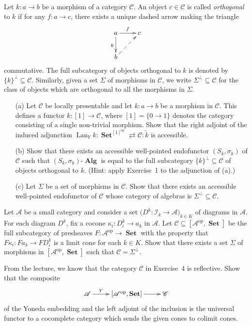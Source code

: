 \documentclass[12pt, a4paper]{article}
\DeclareMathOperator{\op}{op}
\DeclareMathOperator{\Lan}{Lan}
\DeclareMathOperator{\Alg}{\mathbf{Alg}}
\DeclareMathOperator{\Set}{\mathbf{Set}}
\newcommand{\ca}[1]{\mathscr{#1}}
\theoremstyle{plain}
\theoremstyle{definition}
\theoremstyle{citing}
\theoremstyle{citingdfn}
\numberwithin{equation}{section}
\begin{document}
\begin{question}
 Let $k \colon a \rightarrow b$ be a morphism of a category $\ca{C}$. An object $c \in \ca{C}$ is called \emph{orthogonal} to $k$ if for any $f \colon a \rightarrow c$, there exists a unique dashed arrow making the triangle
 \[
 \xymatrix{ a \ar[r]^-{f} \ar[d]_{k} & c \\ b \ar@{-->}[ru]}
 \]
 commutative. The full subcategory of objects orthogonal to $k$ is denoted by $\{k\}^{\perp} \subseteq \ca{C}$. Similarly, given a set $\Sigma$ of morphisms in $\ca{C}$, we write $\Sigma^{\perp} \subseteq \ca{C}$ for the class of objects which are orthogonal to all the morphisms in $\Sigma$.
 
 \begin{enumerate}
 \item[(a)] Let $\ca{C}$ be locally presentable and let $k \colon a \rightarrow b$ be a morphism in $\ca{C}$. This defines a functor $k \colon [1] \rightarrow \ca{C}$, where $[1]=\{0 \rightarrow 1\}$ denotes the category consisting of a single non-trivial morphism. Show that the right adjoint of the induced adjunction $\Lan_Y k \colon \Set^{[1]^{\op}} \rightleftarrows \ca{C} \colon \widetilde{k}$ is accessible.
 
\item[(b)] Show that there exists an accessible well-pointed endofunctor $(S_k,\sigma_k)$ of $\ca{C}$ such that $(S_k,\sigma_k)\mbox{-}\Alg$ is equal to the full subcategory $\{k\}^{\perp}\subseteq \ca{C}$ of objects orthogonal to $k$. (Hint: apply Exercise~1 to the adjunction of (a).)

\item[(c)] Let $\Sigma$ be a set of morphisms in $\ca{C}$. Show that there exists an accessible well-pointed endofunctor of $\ca{C}$ whose category of algebras is $\Sigma^{\perp} \subseteq \ca{C}$.
 \end{enumerate}
\end{question}


\begin{question}
 Let $\ca{A}$ be a small category and consider a set $\bigl(D^{k} \colon \ca{I}_k \rightarrow \ca{A} \bigr)_{k \in K}$ of diagrams in $\ca{A}$. For each diagram $D^k$, fix a cocone $\kappa_i \colon D^k_i \rightarrow a_k$ in $\ca{A}$. Let $\ca{C} \subseteq [\ca{A}^{\op},\Set]$ be the full subcategory of presheaves $F \colon \ca{A}^{\op} \rightarrow \Set$ with the property that $F\kappa_i \colon Fa_k \rightarrow FD^k_i$ is a limit cone for each $k \in K$. Show that there exists a set $\Sigma$ of morphisms in $[\ca{A}^{\op},\Set]$ such that $\ca{C}=\Sigma^{\perp}$.
\end{question}

\begin{question}[subtitle=(bonus)]
 From the lecture, we know that the category $\ca{C}$ in Exercise~4 is reflective. Show that the composite
 \[
 \xymatrix{ \ca{A} \ar[r]^-{Y} & [\ca{A}^{\op},\Set] \ar[r] & \ca{C}}
 \]
 of the Yoneda embedding and the left adjoint of the inclusion is the universal functor to a cocomplete category which sends the given cones to colimit cones.
\end{question}
\end{document}
